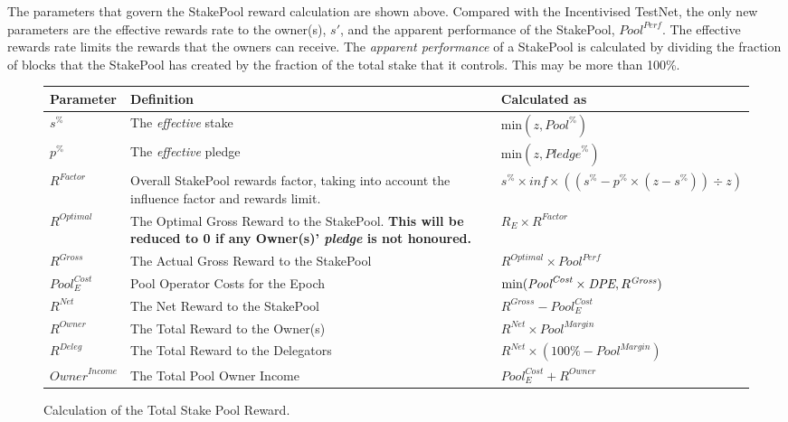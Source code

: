 \documentclass[11pt,a4paper,dvipsnames,twosided,final]{article}
\begin{document}
\noindent
The parameters that govern the StakePool reward calculation are shown above.  Compared with the Incentivised
TestNet, the only new parameters are the effective rewards rate to the owner(s), $s'$, and the apparent performance of the StakePool, $\textit{Pool}^{\textit{Perf}}$.
The effective rewards rate limits the rewards that the owners can receive.  The \emph{apparent performance} of a StakePool is calculated
by dividing the fraction of blocks that the StakePool has created by the fraction of the total stake that it controls.  This may be more than 100\%.

\begin{figure}[h!]
\begin{center}
\begin{tabular}{||l|p{6cm}|l||}
  \hline \hline
  \textbf{Parameter}  & \textbf{Definition} & \textbf{Calculated as} \\\hline
  $s^\%$ & The \emph{effective} stake & $\textrm{min} (z,{\textit{Pool}}^\%)$ \\\hline
  $p^\%$ & The \emph{effective} pledge  & $\textrm{min} (z,{\textit{Pledge}}^\%) $ \\\hline
  $\textit{R}^\textit{Factor}$ & Overall StakePool rewards factor, taking into account the influence factor and rewards limit. & $s^\% \times \textit{inf} \times ((s^\% - p^\% \times (z - s^\%)) \div z)$ \\\hline
  $R^{Optimal}$ & The Optimal Gross Reward to the StakePool.  \textbf{This will be reduced to 0 if any Owner(s)' \emph{pledge} is not honoured.} & $R_E \times \textit{R}^{Factor}$ \\\hline
$R^{\textit{Gross}}$ & The Actual Gross Reward to the StakePool & $R^{Optimal} \times \textit{Pool}^{\textit{Perf}}$ \\\hline
${\textit{Pool}}^{\textit{Cost}}_E$ & Pool Operator Costs for the Epoch & $\textrm{min}(\textit{\textit{Pool}}^{\textit{Cost}} \times \textit{DPE},R^{\textit{Gross}})$ \\\hline
$R^{\textit{Net}}$  & The Net Reward to the StakePool & $R^{\textit{Gross}} - {\textit{Pool}}^{\textit{Cost}}_E$ \\\hline
$R^{\textit{Owner}}$ & The Total Reward to the Owner(s) & $R^{\textit{Net}} \times {\textit{Pool}}^{\textit{Margin}} $ \\\hline
$R^{\textit{Deleg}}$ & The Total Reward to the Delegators & $R^{\textit{Net}} \times (100\% - {\textit{Pool}}^{\textit{Margin}})$ \\\hline
$\textit{Owner}^\textit{Income}$ & The Total Pool Owner Income & ${\textit{Pool}}^{\textit{Cost}}_E + R^{Owner}$ \\\hline
\hline
\end{tabular}
\end{center}
\caption{Calculation of the Total Stake Pool Reward.}
\end{figure}
\end{document}
